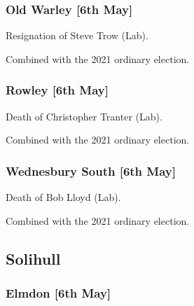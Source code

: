 \documentclass[a4paper,openany]{book}
\begin{document}
\begin{resultsiii}
\subsubsection*{Old Warley \hspace*{\fill}\nolinebreak[1]%
	\enspace\hspace*{\fill}
	[6th May]}


Resignation of Steve Trow (Lab).

Combined with the 2021 ordinary election.

\subsubsection*{Rowley \hspace*{\fill}\nolinebreak[1]%
	\enspace\hspace*{\fill}
	[6th May]}


Death of Christopher Tranter (Lab).

Combined with the 2021 ordinary election.

\subsubsection*{Wednesbury South \hspace*{\fill}\nolinebreak[1]%
	\enspace\hspace*{\fill}
	[6th May]}


Death of Bob Lloyd (Lab).

Combined with the 2021 ordinary election.

\subsection*{Solihull}

\subsubsection*{Elmdon \hspace*{\fill}\nolinebreak[1]%
	\enspace\hspace*{\fill}
	[6th May]}



\end{resultsiii}
\end{document}
